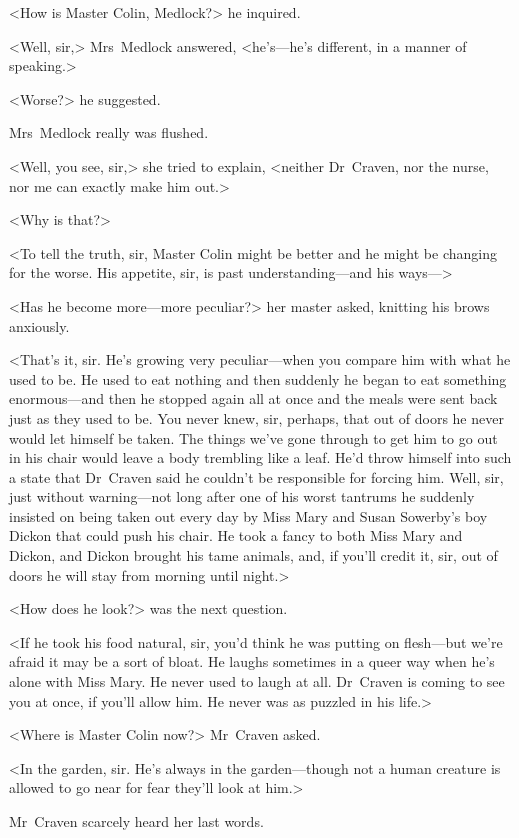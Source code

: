 <How is Master Colin, Medlock?> he inquired.

<Well, sir,> Mrs~Medlock answered, <he's—he's different, in a manner of speaking.>

<Worse?> he suggested.

Mrs~Medlock really was flushed.

<Well, you see, sir,> she tried to explain, <neither Dr~Craven, nor the nurse, nor me can exactly make him out.>

<Why is that?>

<To tell the truth, sir, Master Colin might be better and he might be changing for the worse. His appetite, sir, is past understanding—and his ways—>

<Has he become more—more peculiar?> her master asked, knitting his brows anxiously.

<That's it, sir. He's growing very peculiar—when you compare him with what he used to be. He used to eat nothing and then suddenly he began to eat something enormous—and then he stopped again all at once and the meals were sent back just as they used to be. You never knew, sir, perhaps, that out of doors he never would let himself be taken. The things we've gone through to get him to go out in his chair would leave a body trembling like a leaf. He'd throw himself into such a state that Dr~Craven said he couldn't be responsible for forcing him. Well, sir, just without warning—not long after one of his worst tantrums he suddenly insisted on being taken out every day by Miss Mary and Susan Sowerby's boy Dickon that could push his chair. He took a fancy to both Miss Mary and Dickon, and Dickon brought his tame animals, and, if you'll credit it, sir, out of doors he will stay from morning until night.>

<How does he look?> was the next question.

<If he took his food natural, sir, you'd think he was putting on flesh—but we're afraid it may be a sort of bloat. He laughs sometimes in a queer way when he's alone with Miss Mary. He never used to laugh at all. Dr~Craven is coming to see you at once, if you'll allow him. He never was as puzzled in his life.>

<Where is Master Colin now?> Mr~Craven asked.

<In the garden, sir. He's always in the garden—though not a human creature is allowed to go near for fear they'll look at him.>

Mr~Craven scarcely heard her last words.

